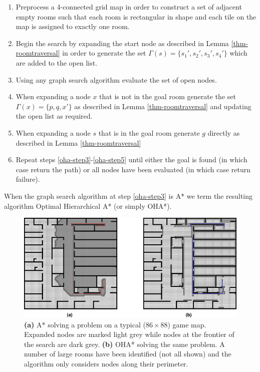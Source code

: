 \begin{enumerate}
\item{\label{oha-step1} Preprocess a 4-connected grid map in order to construct a set of adjacent empty rooms such that 
each room is rectangular in shape and each tile on the map is assigned to exactly one room. }
\item{\label{oha-step2} Begin the search by expanding the start node as described in 
Lemma \ref{thm-roomtraversal} in order to generate the set 
$\Gamma(s) = \lbrace s_{1}', s_{2}', s_{3}', s_{4}'\rbrace$ which are added to the open list. }
\item{\label{oha-step3} Using any graph search algorithm evaluate the set of open nodes.}
\item{\label{oha-step4} When expanding a node $x$ that is not in the goal room generate the set 
$\Gamma(x) = \lbrace p, q, x' \rbrace$ as described in Lemma \ref{thm-roomtraversal} and updating the open
list as required.} 
\item{\label{oha-step5} When expanding a node $s$ that is in the goal room generate $g$ directly as 
described in Lemma \ref{thm-roomtraversal}} 
\item{Repeat steps \ref{oha-step3}-\ref{oha-step5} until either the goal is found (in which case return
the path) or all nodes have been evaluated (in which case return failure).}
\end{enumerate}
When the graph search algorithm at step \ref{oha-step3} is A* we term the resulting algorithm 
Optimal Hierarchical A* (or simply OHA*).

\begin{figure}[htbp]
	\label{fig-oha_contrast}
	\vspace{-4pt}
       \begin{center}
           \includegraphics[scale=0.60, trim = 10mm 10mm 10mm 0mm]{diagrams/oha_contrast.png}
       \end{center}
	\vspace{-3pt}
       \caption{\textbf{(a)} A* solving a problem on a typical ($86\times88$) game map. 
Expanded nodes are marked light grey while nodes at the frontier of the search are dark grey.
\textbf{(b)} OHA* solving the same problem. A number of large rooms have been identified (not
all shown) and the algorithm only considers nodes along their perimeter.}
       \label{fig-ohacontrast}
	\vspace{-15pt}
\end{figure}


